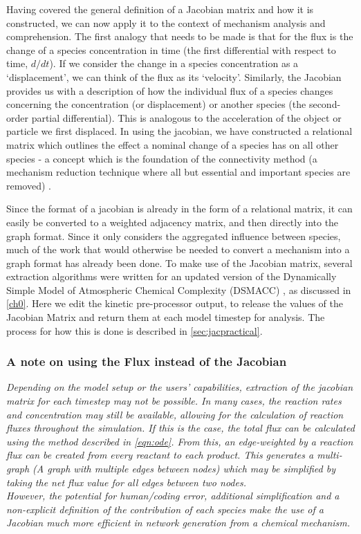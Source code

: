 Having covered the general definition of a Jacobian matrix and how it is constructed, we can now apply it to the context of mechanism analysis and comprehension. The first analogy that needs to be made is that for the flux is the change of a species concentration in time (the first differential with respect to time, $d/dt$). If we consider the change in a species concentration as a `displacement', we can think of the flux as its `velocity'.
Similarly, the Jacobian provides us with a description of how the individual flux of a species changes concerning the concentration (or displacement) or another species (the second-order partial differential). This is analogous to the acceleration of the object or particle we first displaced. In using the jacobian, we have constructed a relational matrix which outlines the effect a nominal change of a species has on all other species - a concept which is the foundation of the connectivity method (a mechanism reduction technique where all but essential and important species are removed) \citep{connectivity}.

Since the format of a jacobian is already in the form of a relational matrix, it can easily be converted to a weighted adjacency matrix, and then directly into the graph format. Since it only considers the aggregated influence between species, much of the work that would otherwise be needed to convert a mechanism into a graph format has already been done. To make use of the Jacobian matrix, several extraction algorithms were written for an updated version of the Dynamically Simple Model of Atmospheric Chemical Complexity (DSMACC) \citep{dsmacc,dsmaccgit}, as discussed in \autoref{ch0}. Here we edit the kinetic pre-processor output, \citep{kpp} to release the values of the Jacobian Matrix and return them at each model timestep for analysis. The process for how this is done is described in \autoref{sec:jacpractical}.



\subsubsection*{ A note on using the Flux instead of the Jacobian }
\textit{
Depending on the model setup or the users' capabilities, extraction of the jacobian matrix for each timestep may not be possible. In many cases, the reaction rates and concentration may still be available, allowing for the calculation of reaction fluxes throughout the simulation. If this is the case, the total flux can be calculated using the method described in  \autoref{eqn:ode}. From this, an edge-weighted by a reaction flux can be created from every reactant to each product. This generates a multi-graph (A graph with multiple edges between nodes) which may be simplified by taking the net flux value for all edges between two nodes. \\
However, the potential for human/coding error, additional simplification and a non-explicit definition of the contribution of each species make the use of a Jacobian much more efficient in network generation from a chemical mechanism. 
}

